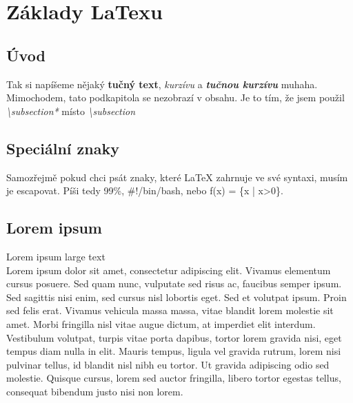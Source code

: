 \usepackage[utf8]{inputenc}
\usepackage[czech]{babel}
\usepackage[T1]{fontenc}


	\tableofcontents
	\newpage

	\section{Základy LaTexu}	
		\subsection*{Úvod}	
		Tak si napíšeme nějaký \textbf{tučný text}, \textit{kurzívu} a \textbf{\textit{tučnou kurzívu}} muhaha. Mimochodem, tato podkapitola se nezobrazí v obsahu. Je to tím, že jsem použil \textit{\textbackslash{}subsection*} místo \textit{\textbackslash{}subsection}\\
	
		\subsection{Speciální znaky}
		Samozřejmě pokud chci psát znaky, které LaTeX zahrnuje ve své syntaxi, musím je escapovat. Píši tedy 99\%, \#!/bin/bash, nebo f(x) = \{x | x>0\}.
	
		\subsection{Lorem ipsum}
		\Large{Lorem ipsum large text}\normalsize \\
		Lorem ipsum dolor sit amet, consectetur adipiscing elit. Vivamus elementum cursus posuere. Sed quam nunc, vulputate sed risus ac, faucibus semper ipsum. Sed sagittis nisi enim, sed cursus nisl lobortis eget. Sed et volutpat ipsum. Proin sed felis erat. Vivamus vehicula massa massa, vitae blandit lorem molestie sit amet. Morbi fringilla nisl vitae augue dictum, at imperdiet elit interdum. Vestibulum volutpat, turpis vitae porta dapibus, tortor lorem gravida nisi, eget tempus diam nulla in elit. Mauris tempus, ligula vel gravida rutrum, lorem nisi pulvinar tellus, id blandit nisl nibh eu tortor. Ut gravida adipiscing odio sed molestie. Quisque cursus, lorem sed auctor fringilla, libero tortor egestas tellus, consequat bibendum justo nisi non lorem.\\

